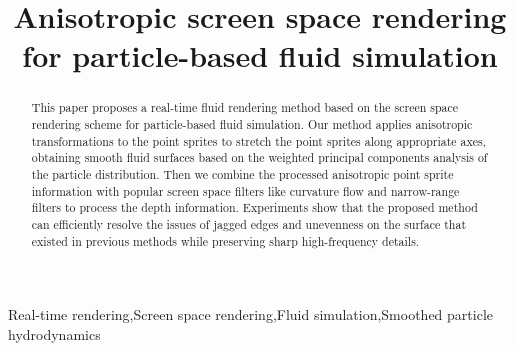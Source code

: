 \documentclass[times,twocolumn,final]{elsarticle}
\begin{document}

\begin{frontmatter}

\title{Anisotropic screen space rendering for particle-based fluid simulation
}%

\author{}
    


\received{\today}


\begin{abstract}
This paper proposes a real-time fluid rendering method based on the screen space rendering scheme for particle-based fluid simulation. Our method applies anisotropic transformations to the point sprites to stretch the point sprites along appropriate axes, obtaining smooth fluid surfaces based on the weighted principal components analysis of the particle distribution. Then we combine the processed anisotropic point sprite information with popular screen space filters like curvature flow and narrow-range filters to process the depth information. Experiments show that the proposed method can efficiently resolve the issues of jagged edges and unevenness on the surface that existed in previous methods while preserving sharp high-frequency details.
\end{abstract}

\begin{keyword}
\KWD Real-time rendering\sep Screen space rendering\sep Fluid simulation\sep Smoothed particle hydrodynamics
\end{keyword}

\end{frontmatter}
\end{document}
